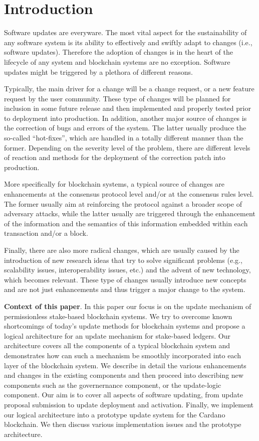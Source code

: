 \section{Introduction}
Software updates are everyware. The most vital aspect for the sustainability of any software system is its ability to effectively and swiftly adapt to changes (i.e., software updates). Therefore the adoption of changes is in the heart of the lifecycle of any system and blockchain systems are no exception. Software updates might be triggered by a plethora of different reasons. 

Typically, the main driver for a change will be a change request, or a new feature request by the user community. These type of changes will be planned for inclusion in some future release and then implemented and properly tested prior to deployment into production. In addition, another major source of changes is the correction of bugs and errors of the system. The latter usually produce the so-called \enquote{hot-fixes}, which are handled in a totally different manner than the former. Depending on the severity level of the problem, there are different levels of reaction and methods for the deployment of the correction patch into production. 

More specifically for blockchain systems, a typical source of changes are enhancements at the consensus protocol level and/or at the consensus rules level. The former usually aim at reinforcing the protocol against a broader scope of adversary attacks, while the latter usually are triggered through the enhancement of the information and the semantics of this information embedded within each transaction and/or a block. 

Finally, there are also more radical changes, which are usually caused by the introduction of new research ideas that try to solve significant problems (e.g., scalability issues, interoperability issues, etc.) and the advent of new technology, which becomes relevant. These type of changes usually introduce new concepts and are not just enhancements and thus trigger a major change to the system.

\noindent\textbf{Context of this paper}. In this paper our focus is on the update mechanism of permissionless stake-based blockchain systems. We try to overcome known shortcomings of today's update methods for blockchain systems and propose a logical architecture for an update mechanism for stake-based ledgers. Our architecture covers all the components of a typical blockchain system and demonstrates how can such a mechanism be smoothly incorporated into each layer of the blockchain system. We describe in detail the various enhancements and changes in the existing components and then proceed into describing new components such as the governernance component, or the update-logic component. Our aim is to cover all aspects of software updating, from update proposal submission to update deployment and activation. Finally, we implement our logical architecture into a prototype update system for the Cardano blockchain. We then discuss various implementation issues and the prototype architecture.

